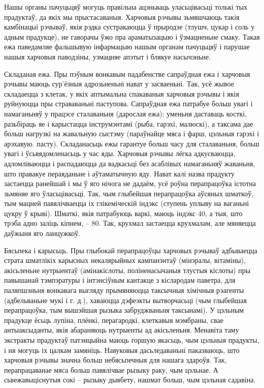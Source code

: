 Нашы органы пачуцьцяў могуць правільна ацэньваць уласьцівасьці толькі тых прадуктаў, да якіх мы прыстасаваныя. Харчовыя рэчывы зьмяшчаюць такія камбінацыі рэчываў, якія рэдка сустракаюцца ў прыродзе (тлушч, цукар і соль у адным прадукце), не гаворачы ўжо пра араматызацыю і ўзмацненьне смаку. Такая ежа паведамляе фальшывую інфармацыю нашым органам пачуцьцяў і парушае нашыя харчовыя паводзіны, узмацняе апэтыт і блякуе насычэньне.

Складаная ежа.
Пры пэўным вонкавым падабенстве сапраўдная ежа і харчовыя рэчывы маюць сур'ёзныя адрозьненьні нават у засваеньні. Так, усё жывое складаецца з клетак, у якіх аптымальна спакаваныя харчовыя рэчывы і якія руйнуюцца пры страваваньні паступова. Сапраўдная ежа патрабуе больш увагі і намаганьняў у працэсе сталаваньня (дарослая ежа): уменьня даставаць косткі, разьбіраць яе і карыстацца інструмэнтамі (рыба, гарэхі, малюскі), а таксама дае больш нагрузкі на жавальную сыстэму (параўнайце мяса і фарш, цэльныя гарэхі і арэхавую. пасту). Складанасьць ежы гарантуе больш часу для сталаваньня, больш увагі і ўсьвядомленасьць у час яды. Харчовыя рэчывы лёгка адкусваюцца, адломліваюцца і распадаюцца да вадкасьці без асаблівых намаганьняў жаваньня, што правакуе пераяданьне і аўтаматычную яду. Нават калі назва прадукту застаецца ранейшай і мы ў яго нічога не дадаём, усё роўна перапрацоўка істотна зьмяняе яго ўласьцівасьці. Так, чым глыбейшая перапрацоўка аўсяных шматкоў, тым мацней павялічваецца іх глікеміческій індэкс (ступень уплыву на ваганьні цукру ў крыві). Шматкі, якія патрабуюць варкі, маюць індэкс 40, а тыя, што трэба адно заліць кіпнем, – 80. Так, крухмал застаецца крухмалам, але мяняецца даўжыня яго ланцужкоў.

Бясьпека і карысьць.
Пры глыбокай перапрацоўцы харчовых рэчываў адбываецца страта шматлікіх карысных некалярыйных кампанэнтаў (мінэралы, вітаміны), акісьленьне нутрыентаў (амінакіслоты, поліненасычаныя тлустыя кіслоты) пры павышанай тэмпэратуры і інтэнсіўным кантакце з кіслародам паветра, для паляпшэньня вонкавага выгляду прымяняюцца таксычныя хімічныя рэагенты (адбельваньне мукі і г. д.), хаваюцца дэфеэкты вытворчасьці (чым глыбейшая перапрацоўка, тым вышэйшая рызыка забруджваньня таксынамі). У цэльным прадукце ёсьць лупіна, плёнкі, перагародкі, клеткавыя мэмбраны, свае антыаксыданты, якія абараняюць нутрыенты ад акісьленьня. Менавіта таму экстракты прадуктаў патэнцыйна маюць горшую якасьць, чым цэльныя прадукты, і ня могуць іх цалкам замяніць. Навуковыя дасьледаваньні паказваюць, што харчовыя рэчывы значна больш небясьпечныя для нашага здароўя. Так, перапрацаванае мяса больш павялічвае рызыку раку, чым цэльнае. А сьвежавыціснутыя сокі – рызыку дыябету, нашмат больш, чым цэльная садавіна.

